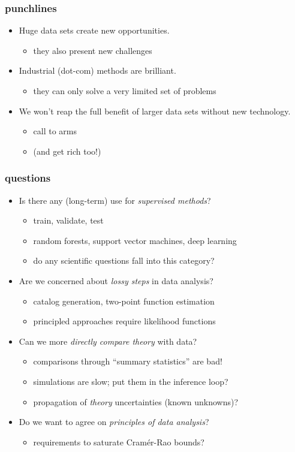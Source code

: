 \documentclass[pdftex]{beamer}
\newcommand{\conclusion}{
\begin{frame}
  \frametitle{punchlines}
  \begin{itemize}
  \item Huge data sets create new opportunities.
    \begin{itemize}
    \item they also present new challenges
    \end{itemize}
  \item Industrial (dot-com) methods are brilliant.
    \begin{itemize}
    \item they can only solve a very limited set of problems
    \end{itemize}
  \item We won't reap the full benefit of larger data sets without new technology.
    \begin{itemize}
    \item call to arms
    \item (and get rich too!)
    \end{itemize}
  \end{itemize}
\end{frame}
}
\begin{document}
\conclusion

\begin{frame}
  \frametitle{questions}
  \begin{itemize}
  \item Is there any (long-term) use for \emph{supervised methods}?
    \begin{itemize}
    \item train, validate, test
    \item random forests, support vector machines, deep learning
    \item do any scientific questions fall into this category?
    \end{itemize}
  \item Are we concerned about \emph{lossy steps} in data analysis?
    \begin{itemize}
    \item catalog generation, two-point function estimation
    \item principled approaches require likelihood functions
    \end{itemize}
  \item Can we more \emph{directly compare theory} with data?
    \begin{itemize}
    \item comparisons through ``summary statistics'' are bad!
    \item simulations are slow; put them in the inference loop?
    \item propagation of \emph{theory} uncertainties (known unknowns)?
    \end{itemize}
  \item Do we want to agree on \emph{principles of data analysis}?
    \begin{itemize}
    \item requirements to saturate Cram\'er-Rao bounds?
    \end{itemize}
  \end{itemize}
\end{frame}
\end{document}
